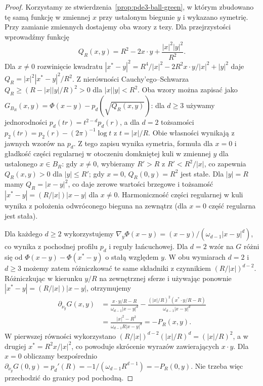 \begin{proof}
Korzystamy ze stwierdzenia~\ref{prop:pde3-ball-green},
w którym zbudowano tę samą funkcję w zmiennej $x$
przy ustalonym biegunie $y$ i wykazano symetrię.
Przy zamianie zmiennych dostajemy oba wzory z tezy.
Dla przejrzystości wprowadźmy funkcję
\[
 Q_R(x,y)=R^2-2x\cdot y+\frac{|x|^2|y|^2}{R^2}.
\]
Dla $x\ne0$ rozwinięcie kwadratu
$|x^*-y|^2=R^4/|x|^2-2R^2x\cdot y/|x|^2+|y|^2$
daje $Q_R=|x|^2|x^*-y|^2/R^2$.
Z nierówności Cauchy'ego--Schwarza
$Q_R\ge(R-|x||y|/R)^2>0$ dla $|x||y|<R^2$.
Oba wzory można zapisać jako
$G_{B_R}(x,y)=\Phi(x-y)-p_d(\sqrt{Q_R(x,y)})$:
dla $d\ge3$ używamy jednorodności $p_d(tr)=t^{2-d}p_d(r)$,
a dla $d=2$ tożsamości $p_2(tr)=p_2(r)-(2\pi)^{-1}\log t$
z $t=|x|/R$. Obie własności wynikają z jawnych wzorów
na $p_d$.
Z tego zapisu wynika symetria, formuła dla $x=0$
i gładkość części regularnej w otoczeniu domkniętej kuli
w zmiennej $y$ dla ustalonego $x\in B_R$:
gdy $x\ne0$, wybieramy $R'>R$ z $R'<R^2/|x|$,
co zapewnia $Q_R(x,y)>0$ dla $|y|\le R'$;
gdy $x=0$, $Q_R(0,y)=R^2$ jest stałe.
Dla $|y|=R$ mamy $Q_R=|x-y|^2$, co daje zerowe
wartości brzegowe i tożsamość
$|x^*-y|=(R/|x|)|x-y|$ dla $x\ne0$.
Harmoniczność części regularnej w kuli wynika z położenia
odwróconego bieguna na zewnątrz (dla $x=0$ część
regularna jest stała).

Dla każdego $d\ge2$ wykorzystujemy
$\nabla_y\Phi(x-y)=(x-y)/(\omega_{d-1}|x-y|^d)$,
co wynika z pochodnej profilu $p_d$ i reguły łańcuchowej.
Dla $d=2$ wzór na $G$ różni się od
$\Phi(x-y)-\Phi(x^*-y)$ o stałą względem $y$.
W obu wymiarach $d=2$ i $d\ge3$ możemy zatem
różniczkować te same składniki z czynnikiem
$(R/|x|)^{d-2}$. Różniczkując w kierunku $y/R$
na zewnętrznej sferze i używając ponownie
$|x^*-y|=(R/|x|)|x-y|$, otrzymujemy
\begin{align*}
 \partial_{\nu_y}G(x,y)
 &=\frac{x\cdot y/R-R}{\omega_{d-1}|x-y|^d}
 -\frac{(|x|/R)^2(x^*\cdot y/R-R)}
 {\omega_{d-1}|x-y|^d}\\
 &=\frac{|x|^2-R^2}{\omega_{d-1}R|x-y|^d}
 =-P_R(x,y).
\end{align*}
W pierwszej równości wykorzystano
$(R/|x|)^{d-2}(|x|/R)^d=(|x|/R)^2$,
a w drugiej $x^*=R^2x/|x|^2$, co powoduje skrócenie
wyrazów zawierających $x\cdot y$.
Dla $x=0$ obliczamy bezpośrednio
$\partial_{\nu_y}G(0,y)=p_d'(R)
=-1/(\omega_{d-1}R^{d-1})=-P_R(0,y)$.
Nie trzeba więc przechodzić do granicy pod pochodną.
\end{proof}

